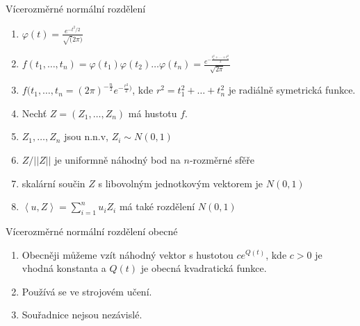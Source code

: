 \documentclass[../main.tex]{subfiles}
\begin{document}
Vícerozměrné normální rozdělení\\

\begin{enumerate}
    \item $\varphi(t) = \frac{e^{-t^2/2}}{\sqrt(2\pi)}$
    \item $f(t_1,\dots, t_n) = \varphi(t_1)\varphi(t_2)\dots \varphi(t_n) = \frac{e^{-\frac{t^2_1 + \dots + t^2_n}{2}}}{\sqrt{2\pi}}$
    \item $f(t_1,\dots, t_n = (2\pi)^{-\frac{n}{2}}e^{-\frac{r^2}{2})}$, kde $r^2 = t^2_1 + \dots + t^2_n$ je radiálně symetrická funkce.
    \item Nechť $Z = (Z_1,\dots, Z_n)$ má hustotu $f$.
    \item $Z_1,\dots,Z_n$ jsou n.n.v, $Z_i \sim N(0,1)$
    \item $Z/||Z||$ je uniformně náhodný bod na $n$-rozměrné sfěře
    \item skalární součin $Z$ s libovolným jednotkovým vektorem je $N(0,1)$
    \item $\left< u, Z \right> = \sum^n_{i=1} u_i Z_i$ má také rozdělení $N(0,1)$
\end{enumerate}

Vícerozměrné normální rozdělení obecné\\

\begin{enumerate}
    \item Obecněji můžeme vzít náhodný vektor s hustotou $ce^{Q(t)}$, kde $c > 0$ je vhodná konstanta a $Q(t)$ je obecná kvadratická funkce.
    \item Používá se ve strojovém učení.
    \item Souřadnice nejsou nezávislé.
\end{enumerate}
\end{document}
